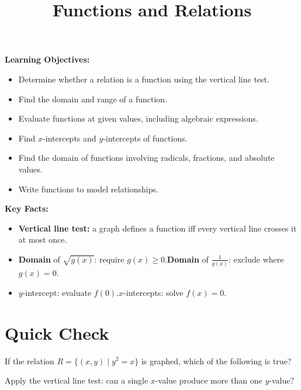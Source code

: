 \documentclass{ximera}
\title{Functions and Relations}
\begin{document}
\begin{abstract}
\end{abstract}
\maketitle

\textbf{Learning Objectives:}
\begin{itemize}
  \item Determine whether a relation is a function using the vertical line test.
  \item Find the domain and range of a function.
  \item Evaluate functions at given values, including algebraic expressions.
  \item Find $x$-intercepts and $y$-intercepts of functions.
  \item Find the domain of functions involving radicals, fractions, and absolute values.
  \item Write functions to model relationships.
\end{itemize}
\medskip

\noindent\textbf{Key Facts:}
\begin{itemize}
  \item \textbf{Vertical line test:} a graph defines a function iff every vertical line crosses it at most once.
  \item \textbf{Domain} of $\sqrt{g(x)}$: require $g(x)\geq 0$.\quad \textbf{Domain} of $\frac{1}{g(x)}$: exclude where $g(x)=0$.
  \item $y$-intercept: evaluate $f(0)$.\quad $x$-intercepts: solve $f(x)=0$.
\end{itemize}

\bigskip
\section*{Quick Check}

\begin{problem}
If the relation $R = \{(x,y) \mid y^2 = x\}$ is graphed, which of the following is true?
\begin{hint}
Apply the vertical line test: can a single $x$-value produce more than one $y$-value?
\end{hint}
\begin{multipleChoice}
\end{multipleChoice}
\end{problem}
\end{document}
